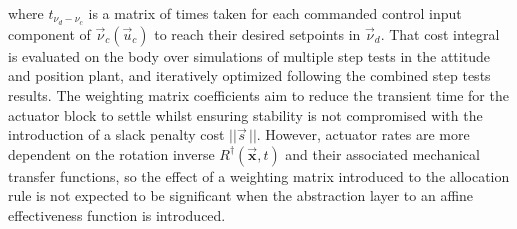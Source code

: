 where $t_{\nu_d-\nu_c}$ is a matrix of times taken for each commanded control input component of $\vec{\nu}_c(\vec{u}_c)$ to reach their desired setpoints in $\vec{\nu}_d$. That cost integral is evaluated on the body over simulations of multiple step tests in the attitude and position plant, and iteratively optimized following the combined step tests results. The weighting matrix coefficients aim to reduce the transient time for the actuator block to settle whilst ensuring stability is not compromised with the introduction of a slack penalty cost $||\vec{s}\hspace{2pt}||$. However, actuator rates are more dependent on the rotation inverse $R^\dagger(\vec{\mathbf{x}},t)$ and their associated mechanical transfer functions, so the effect of a weighting matrix introduced to the allocation rule is not expected to be significant when the abstraction layer to an affine effectiveness function is introduced.